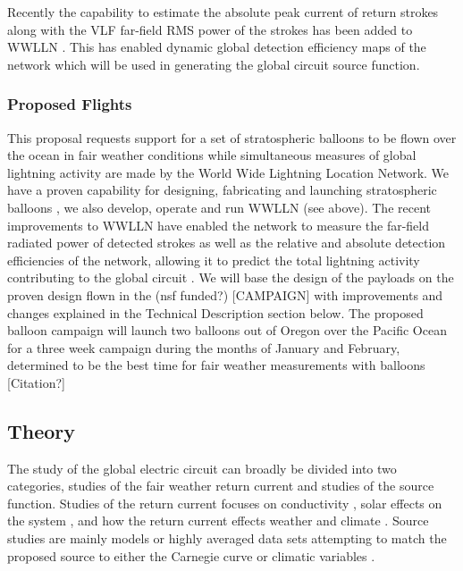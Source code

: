 \documentclass[12pt, letterpaper, onecolumn, oneside]{article}
\begin{document}
Recently the capability to estimate the absolute peak current of return strokes along with the VLF far-field RMS power of the strokes has been added to WWLLN \citep{Hutchins2011}. This has enabled dynamic global detection efficiency maps of the network which will be used in generating the global circuit source function.

\subsubsection*{Proposed Flights}

This proposal requests support for a set of stratospheric balloons to be flown over the ocean in fair weather conditions while simultaneous measures of global lightning activity are made by the World Wide Lightning Location Network. We have a proven capability for designing, fabricating and launching stratospheric balloons \citep{Holzworth2005,Thomas2004,Holzworth1985}, we also develop, operate and run WWLLN (see above). The recent improvements to WWLLN have enabled the network to measure the far-field radiated power of detected strokes as well as the relative and absolute detection efficiencies of the network, allowing it to predict the total lightning activity contributing to the global circuit \citep{Hutchins2011}. We will base the design of the payloads on the proven design flown in the (nsf funded?) [CAMPAIGN] with improvements and changes explained in the Technical Description section below.
The proposed balloon campaign will launch two balloons out of Oregon over the Pacific Ocean for a three week campaign during the months of January and February, determined to be the best time for fair weather measurements with balloons [Citation?]

\subsection*{Theory}

The study of the global electric circuit can broadly be divided into two categories, studies of the fair weather return current and studies of the source function. Studies of the return current focuses on conductivity \citep{Rycroft2008}, solar effects on the system \citep{Tinsley2007}, and how the return current effects weather and climate \citep{Kniveton2008}. Source studies are mainly models or highly averaged data sets attempting to match the proposed source to either the Carnegie curve or climatic variables \citep{Liu2010}.
\end{document}
